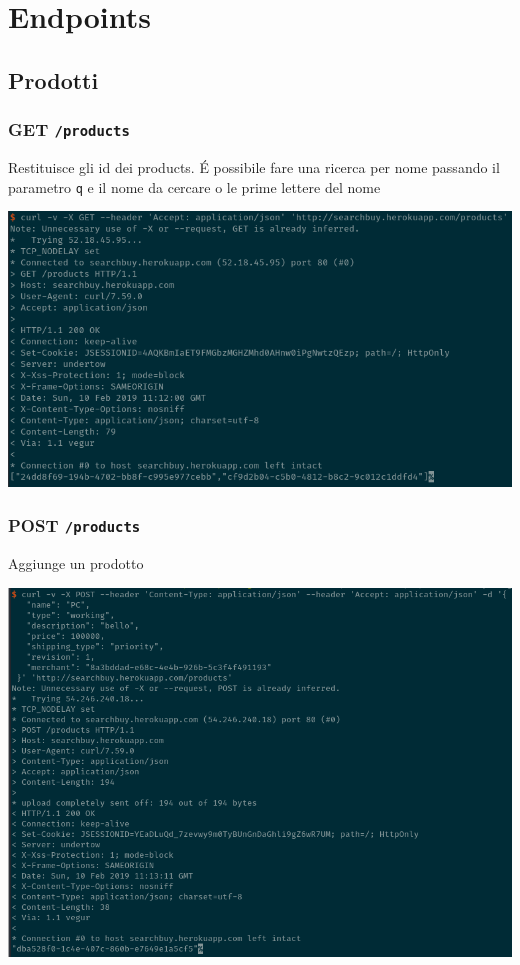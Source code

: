 \documentclass[11pt]{article}
\begin{document}
\section{Endpoints}
\label{sec:org60e4e45}
\subsection{Prodotti}
\label{sec:orgcafc400}
\subsubsection{GET \texttt{/products}}
\label{sec:org0e1fecd}
Restituisce gli id dei products.
É possibile fare una ricerca per nome passando il parametro \texttt{q} e il nome da cercare o le prime lettere del nome
\begin{center}
\includegraphics[width=.9\linewidth]{img/products-screen/get-products.png}
\end{center}
\subsubsection{POST \texttt{/products}}
\label{sec:org82cb4a6}
Aggiunge un prodotto
\begin{center}
\includegraphics[width=.9\linewidth]{img/products-screen/post-products.png}
\end{center}
\end{document}
